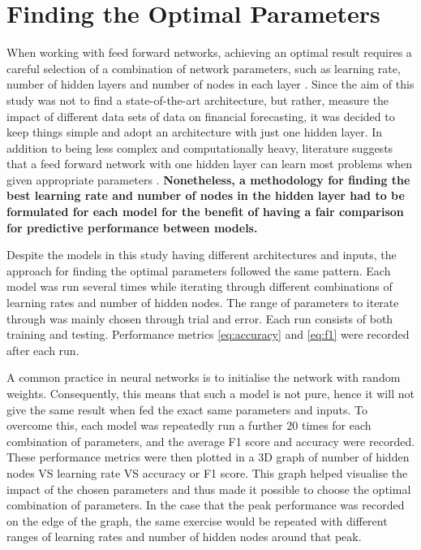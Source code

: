 \documentclass{UoYCSproject}
\begin{document}
\section{Finding the Optimal Parameters}
\label{sec:optimalparams}
When working with feed forward networks, achieving an optimal result requires a careful selection of a combination of network parameters, such as learning rate, number of hidden layers and number of nodes in each layer \cite{hussain2008financial}. Since the aim of this study was not to find a state-of-the-art architecture, but rather, measure the impact of different data sets of data on financial forecasting, it was decided to keep things simple and adopt an architecture with just one hidden layer. In addition to being less complex and computationally heavy, literature suggests that a feed forward network with one hidden layer can learn most problems when given appropriate parameters \cite{cybenko1989approximation}. \textbf{Nonetheless, a methodology for finding the best learning rate and number of nodes in the hidden layer had to be formulated for each model for the benefit of having a fair comparison for predictive performance between models.}

Despite the models in this study having different architectures and inputs, the approach for finding the optimal parameters followed the same pattern. Each model was run several times while iterating through different combinations of learning rates and number of hidden nodes. The range of parameters to iterate through was mainly chosen through trial and error. Each run consists of both training and testing. Performance metrics \ref{eq:accuracy} and \ref{eq:f1} were recorded after each run.

A common practice in neural networks is to initialise the network with random weights. Consequently, this means that such a model is not pure, hence it will not give the same result when fed the exact same parameters and inputs. To overcome this, each model was repeatedly run a further $20$ times for each combination of parameters, and the average F1 score and accuracy were recorded. These performance metrics were then plotted in a 3D graph of number of hidden nodes VS learning rate VS accuracy or F1 score. This graph helped visualise the impact of the chosen parameters and thus made it possible to choose the optimal combination of parameters. In the case that the peak performance was recorded on the edge of the graph, the same exercise would be repeated with different ranges of learning rates and number of hidden nodes around that peak.
\end{document}
